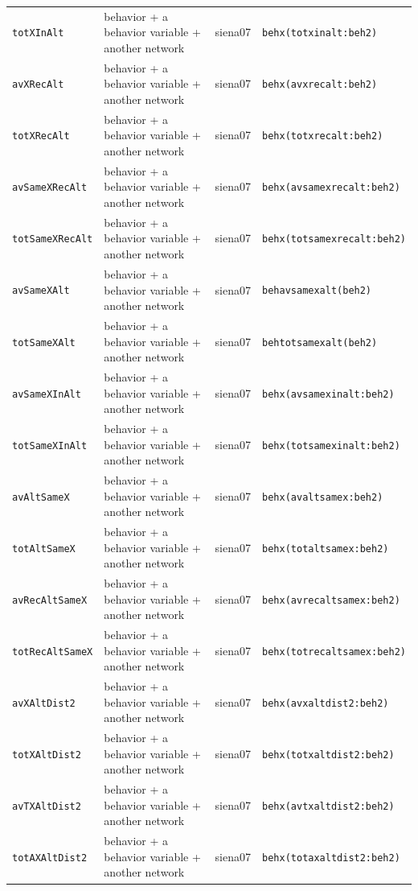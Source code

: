 \begin{longtable}{@{}p{2.6cm}p{3.2cm}p{2.9cm}p{5.4cm}@{}}
\texttt{totXInAlt} & behavior + a behavior variable + another network & siena07 & \texttt{behx(totxinalt:beh2)}\\
\texttt{avXRecAlt} & behavior + a behavior variable + another network & siena07 & \texttt{behx(avxrecalt:beh2)}\\
\texttt{totXRecAlt} & behavior + a behavior variable + another network & siena07 & \texttt{behx(totxrecalt:beh2)}\\
\texttt{avSameXRecAlt} & behavior + a behavior variable + another network & siena07 & \texttt{behx(avsamexrecalt:beh2)}\\
\texttt{totSameXRecAlt} & behavior + a behavior variable + another network & siena07 & \texttt{behx(totsamexrecalt:beh2)}\\
\texttt{avSameXAlt} & behavior + a behavior variable + another network & siena07 & \texttt{behavsamexalt(beh2)}\\
\texttt{totSameXAlt} & behavior + a behavior variable + another network & siena07 & \texttt{behtotsamexalt(beh2)}\\
\texttt{avSameXInAlt} & behavior + a behavior variable + another network & siena07 & \texttt{behx(avsamexinalt:beh2)}\\
\texttt{totSameXInAlt} & behavior + a behavior variable + another network & siena07 & \texttt{behx(totsamexinalt:beh2)}\\
\texttt{avAltSameX} & behavior + a behavior variable + another network & siena07 & \texttt{behx(avaltsamex:beh2)}\\
\texttt{totAltSameX} & behavior + a behavior variable + another network & siena07 & \texttt{behx(totaltsamex:beh2)}\\
\texttt{avRecAltSameX} & behavior + a behavior variable + another network & siena07 & \texttt{behx(avrecaltsamex:beh2)}\\
\texttt{totRecAltSameX} & behavior + a behavior variable + another network & siena07 & \texttt{behx(totrecaltsamex:beh2)}\\
\texttt{avXAltDist2} & behavior + a behavior variable + another network & siena07 & \texttt{behx(avxaltdist2:beh2)}\\
\texttt{totXAltDist2} & behavior + a behavior variable + another network & siena07 & \texttt{behx(totxaltdist2:beh2)}\\
\texttt{avTXAltDist2} & behavior + a behavior variable + another network & siena07 & \texttt{behx(avtxaltdist2:beh2)}\\
\texttt{totAXAltDist2} & behavior + a behavior variable + another network & siena07 & \texttt{behx(totaxaltdist2:beh2)}\\

\end{longtable}
